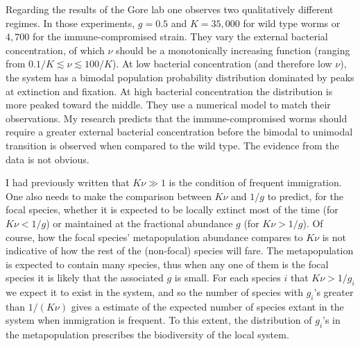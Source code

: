 Regarding the results of the Gore lab \cite{Vega2017} one observes two qualitatively different regimes. 
In those experiments, $g=0.5$ and $K=35,000$ for wild type worms or $4,700$ for the immune-compromised strain. 
They vary the external bacterial concentration, of which $\nu$ should be a monotonically increasing function (ranging from $0.1/K \lesssim \nu \lesssim 100/K$). 
At low bacterial concentration (and therefore low $\nu$), the system has a bimodal population probability distribution dominated by peaks at extinction and fixation. 
At high bacterial concentration the distribution is more peaked toward the middle. %
They use a numerical model to match their observations. 
My research predicts that the immune-compromised worms should require a greater external bacterial concentration before the bimodal to unimodal transition is observed when compared to the wild type. 
The evidence from the data is not obvious. 

I had previously written that $K\nu \gg 1$ is the condition of frequent immigration. 
One also needs to make the comparison between $K\nu$ and $1/g$ to predict, for the focal species, whether it is expected to be locally extinct most of the time (for $K\nu<1/g$) or maintained at the fractional abundance $g$ (for $K\nu>1/g$). 
Of course, how the focal species' metapopulation abundance compares to $K\nu$ is not indicative of how the rest of the (non-focal) species will fare. %
The metapopulation is expected to contain many species, thus when any one of them is the focal species it is likely that the associated $g$ is small. 
For each species $i$ that $K\nu>1/g_i$ we expect it to exist in the system, and so the number of species with $g_i$'s greater than $1/(K\nu)$ gives a estimate of the expected number of species extant in the system when immigration is frequent. 
To this extent, the distribution of $g_i$'s in the metapopulation prescribes the biodiversity of the local system. 



